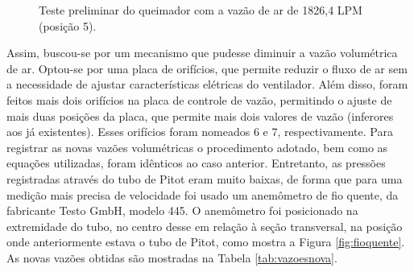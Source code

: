 \begin{figure}[!ht]
	\centering
	\caption{Teste preliminar do queimador com a vazão de ar de 1826,4 LPM (posição 5).}
	\label{fig:preliminar}
\end{figure}

Assim, buscou-se por um mecanismo que pudesse diminuir a vazão volumétrica de ar. Optou-se por uma placa de orifícios, que permite reduzir o fluxo de ar sem a necessidade de ajustar características elétricas do ventilador. Além disso, foram feitos mais dois orifícios na placa de controle de vazão, permitindo o ajuste de mais duas posições da placa, que permite mais dois valores de vazão (inferores aos já existentes). Esses orifícios foram nomeados 6 e 7, respectivamente. Para registrar as novas vazões volumétricas o procedimento adotado, bem como as equações utilizadas, foram idênticos ao caso anterior. Entretanto, as pressões registradas através do tubo de Pitot eram muito baixas, de forma que para uma medição mais precisa de velocidade foi usado um anemômetro de fio quente, da fabricante Testo GmbH, modelo 445. O anemômetro foi posicionado na extremidade do tubo, no centro desse em relação à seção transversal, na posição onde anteriormente estava o tubo de Pitot, como mostra a Figura \ref{fig:fioquente}. As novas vazões obtidas são mostradas na Tabela \ref{tab:vazoesnova}.

